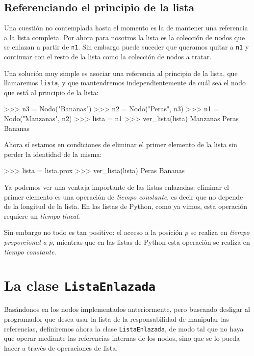 \subsection{Referenciando el principio de la lista}

Una cuestión no contemplada hasta el momento es la de mantener una referencia
a la lista completa. Por ahora para nosotros la lista es la colección de nodos
que se enlazan a partir de \lstinline|n1|. Sin embargo puede suceder que queramos
quitar a \lstinline|n1| y continuar con el resto de la lista como la colección de
nodos a tratar.

Una solución muy simple es asociar una referencia al principio de la lista,
que llamaremos \lstinline|lista|, y que mantendremos independientemente de cuál sea
el nodo que está al principio de la lista:

\begin{codigo-python-sn}
>>> n3 = Nodo("Bananas")
>>> n2 = Nodo("Peras", n3)
>>> n1 = Nodo("Manzanas", n2)
>>> lista = n1
>>> ver_lista(lista)
Manzanas
Peras
Bananas
\end{codigo-python-sn}

Ahora sí estamos en condiciones de eliminar el primer elemento de la lista
sin perder la identidad de la misma:

\begin{codigo-python-sn}
>>> lista = lista.prox
>>> ver_lista(lista)
Peras
Bananas
\end{codigo-python-sn}

Ya podemos ver una ventaja importante de las listas enlazadas:
eliminar el primer elemento es una operación de \emph{tiempo constante}, es
decir que no depende de la longitud de la lista. En las listas de
Python, como ya vimos, esta operación requiere un \emph{tiempo lineal}.

Sin embargo no todo es tan positivo: el acceso a la posición $p$ se realiza
en \emph{tiempo proporcional a $p$}, mientras que en las listas de Python esta
operación se realiza en \emph{tiempo constante}.

\section{La clase {\tt ListaEnlazada}}

Basándonos en los nodos implementados anteriormente, pero buscando
desligar al programador que desea usar la lista de la responsabilidad de
manipular las referencias, definiremos ahora la clase
\lstinline!ListaEnlazada!, de modo tal que no haya que operar mediante las
referencias internas de los nodos, sino que se lo pueda hacer a través de
operaciones de lista.

